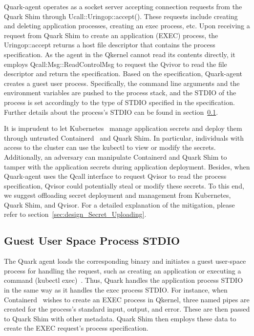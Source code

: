 Quark-agent operates as a socket server accepting connection requests from the Quark Shim through Ucall::Uringop::accept(). These requests include creating and deleting application processes, creating an exec process, etc. Upon receiving a request from Quark Shim to create an application (EXEC) 
 process, the Uringop::accept returns a host file descriptor that contains the process specification. As the agent in the Qkernel cannot read its contents directly, it employs Qcall:Msg::ReadControlMsg to request the Qvivor to read the file descriptor and return the specification. Based on the 
 specification, Quark-agent creates a guest user process. Specifically, the command line arguments and the environment variables are pushed to the process stack, and the STDIO of the process is set accordingly to the type of STDIO specified in the specification. Further details about the process’s 
 STDIO can be found in section~\ref{sec:security_analyse_STDIO}.

It is imprudent to let Kubernetes~\cite*{k8s} manage application secrets and deploy them through untrusted Containerd~\cite*{containerd} and Quark Shim. In particular, individuals with access to the cluster can use the kubectl to view or modify the secrets. Additionally, an adversary can manipulate Containerd 
and Quark Shim to tamper with the application secrets during application deployment. Besides, when Quark-agent uses the Qcall interface to request Qvisor to read the process specification, Qvisor could potentially steal or modify these secrets. To this end, we suggest offloading secret deployment and management 
from Kubernetes, Quark Shim, and Qvisor. For a detailed explanation of the mitigation, please refer to section~\ref{sec:design_Secret_Uploading}.

\subsection{Guest User Space Process STDIO}
\label{sec:security_analyse_STDIO}

The Quark agent loads the corresponding binary and initiates a guest user-space process for handling the request, such as creating an application or executing a command (kubectl exec)~\cite*{k8s}. Thus, Quark handles the application process STDIO in the same way as it handles the exec process STDIO. For instance, 
when Containerd~\cite*{containerd} wishes to create an EXEC process in Qkernel, three named pipes are created for the process’s standard input, output, and error. These are then passed to Quark Shim with other metadata. Quark Shim then employs these data to create the  EXEC request’s process 
specification.

